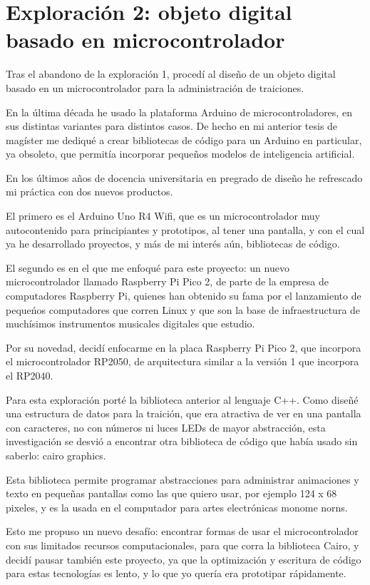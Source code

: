 \documentclass{article}
\begin{document}
\clearpage

\section{Exploración 2: objeto digital basado en microcontrolador}

Tras el abandono de la exploración 1, procedí al diseño de un objeto digital basado en un microcontrolador para la administración de traiciones.

En la última década he usado la plataforma Arduino de microcontroladores, en sus distintas variantes para distintos casos. De hecho en mi anterior tesis de magíster me dediqué a crear bibliotecas de código para un Arduino en particular, ya obsoleto, que permitía incorporar pequeños modelos de inteligencia artificial.

En los últimos años de docencia universitaria en pregrado de diseño he refrescado mi práctica con dos nuevos productos.

El primero es el Arduino Uno R4 Wifi, que es un microcontrolador muy autocontenido para principiantes y prototipos, al tener una pantalla, y con el cual ya he desarrollado proyectos, y más de mi interés aún, bibliotecas de código.

El segundo es en el que me enfoqué para este proyecto: un nuevo microcontrolador llamado Raspberry Pi Pico 2, de parte de la empresa de computadores Raspberry Pi, quienes han obtenido su fama por el lanzamiento de pequeńos computadores que corren Linux y que son la base de infraestructura de muchísimos instrumentos musicales digitales que estudio.

Por su novedad, decidí enfocarme en la placa Raspberry Pi Pico 2, que incorpora el microcontrolador RP2050, de arquitectura similar a la versión 1 que incorpora el RP2040.

Para esta exploración porté la biblioteca anterior al lenguaje C++. Como diseñé una estructura de datos para la traición, que era atractiva de ver en una pantalla con caracteres, no con números ni luces LEDs de mayor abstracción, esta investigación se desvió a encontrar otra biblioteca de código que había usado sin saberlo: cairo graphics\cite{cairoGraphics}.

Esta biblioteca permite programar abstracciones para administrar animaciones y texto en pequeñas pantallas como las que quiero usar, por ejemplo 124 x 68 pixeles, y es la usada en el computador para artes electrónicas monome norns.

Esto me propuso un nuevo desafío: encontrar formas de usar el microcontrolador con sus limitados recursos computacionales, para que corra la biblioteca Cairo, y decidí pausar también este proyecto, ya que la optimización y escritura de código para estas tecnologías es lento, y lo que yo quería era prototipar rápidamente.
\end{document}
